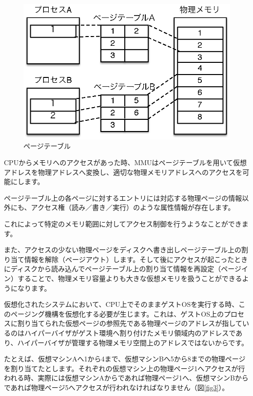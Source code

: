 \begin{figure}\centering
\includegraphics{figures/part2_fig2.eps}
\caption{ページテーブル}
\label{fig2}
\end{figure}

CPUからメモリへのアクセスがあった時、MMUはページテーブルを用いて仮想アドレスを物理アドレスへ変換し、適切な物理メモリアドレスへのアクセスを可能にします。

ページテーブル上の各ページに対するエントリには対応する物理ページの情報以外にも、アクセス権（読み／書き／実行）のような属性情報が存在します。

これによって特定のメモリ範囲に対してアクセス制御を行うようなことができます。

また、アクセスの少ない物理ページをディスクへ書き出しページテーブル上の割り当て情報を解除（ページアウト）します。そして後にアクセスが起こったときにディスクから読み込んでページテーブル上の割り当て情報を再設定（ページイン）することで、物理メモリ容量よりも大きな仮想メモリを扱うことができるようになります。

仮想化されたシステムにおいて、CPU上でそのままゲストOSを実行する時、このページング機構を仮想化する必要が生じます。これは、ゲストOS上のプロセスに割り当てられた仮想ページの参照先である物理ページのアドレスが指しているのはハイパーバイザがゲスト環境へ割り付けたメモリ領域内のアドレスであり、ハイパーバイザが管理する物理メモリ空間上のアドレスではないからです。

たとえば、仮想マシンAへ1から4まで、仮想マシンBへ5から8までの物理ページを割り当てたとします。それぞれの仮想マシン上の物理ページ1へアクセスが行われる時、実際には仮想マシンAからであれば物理ページ1へ、仮想マシンBからであれば物理ページ5へアクセスが行われなければなりません（図\ref{fig3}）。


